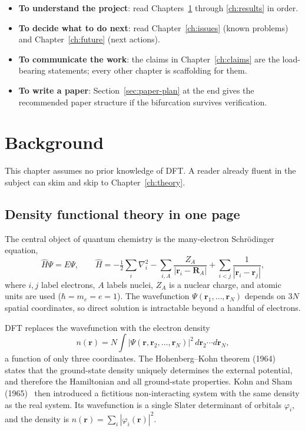 \documentclass[11pt]{report}
\theoremstyle{definition}
\theoremstyle{remark}
\begin{document}
\begin{itemize}
  \item \textbf{To understand the project}: read Chapters~\ref{ch:background}
        through \ref{ch:results} in order.
  \item \textbf{To decide what to do next}: read Chapter~\ref{ch:issues}
        (known problems) and Chapter~\ref{ch:future} (next actions).
  \item \textbf{To communicate the work}: the claims in
        Chapter~\ref{ch:claims} are the load-bearing statements; every
        other chapter is scaffolding for them.
  \item \textbf{To write a paper}: Section~\ref{sec:paper-plan} at the end
        gives the recommended paper structure if the bifurcation survives
        verification.
\end{itemize}

\chapter{Background}
\label{ch:background}

This chapter assumes no prior knowledge of DFT. A reader already fluent in
the subject can skim and skip to Chapter~\ref{ch:theory}.

\section{Density functional theory in one page}

The central object of quantum chemistry is the many-electron Schr\"odinger
equation,
\begin{equation}
\hat H \Psi = E \Psi,
\qquad
\hat H = -\tfrac12 \sum_i \nabla_i^2
        - \sum_{i,A} \frac{Z_A}{|\mathbf r_i - \mathbf R_A|}
        + \sum_{i<j} \frac{1}{|\mathbf r_i - \mathbf r_j|},
\label{eq:many-body-h}
\end{equation}
where $i,j$ label electrons, $A$ labels nuclei, $Z_A$ is a nuclear charge,
and atomic units are used ($\hbar = m_e = e = 1$). The wavefunction
$\Psi(\mathbf r_1, \dots, \mathbf r_N)$ depends on $3N$ spatial coordinates,
so direct solution is intractable beyond a handful of electrons.

DFT replaces the wavefunction with the electron density
\begin{equation}
n(\mathbf r) = N \int |\Psi(\mathbf r, \mathbf r_2, \dots, \mathbf r_N)|^2
               \, d\mathbf r_2 \cdots d\mathbf r_N,
\end{equation}
a function of only three coordinates. The Hohenberg--Kohn theorem (1964)~\cite{HK1964}
states that the ground-state density uniquely determines the external
potential, and therefore the Hamiltonian and all ground-state properties.
Kohn and Sham (1965)~\cite{KS1965} then introduced a fictitious non-interacting system
with the same density as the real system. Its wavefunction is a single
Slater determinant of orbitals $\varphi_i$, and the density is
$n(\mathbf r) = \sum_i |\varphi_i(\mathbf r)|^2$.
\end{document}
